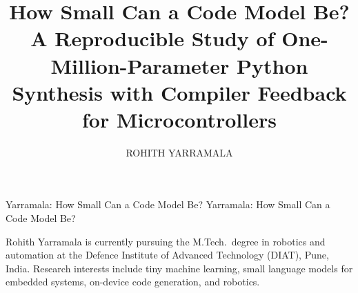 \documentclass{ieeeaccess}
\begin{document}

\title{How Small Can a Code Model Be? A Reproducible Study of One-Million-Parameter Python Synthesis with Compiler Feedback for Microcontrollers}
\author{\uppercase{Rohith Yarramala}}
\address[1]{Robotics and Automation Group, Defence Institute of Advanced Technology (DIAT), Girinagar, Pune 411025, India (e-mail: yarramala.maecas26@diat.ac.in)}

\markboth
{Yarramala: How Small Can a Code Model Be?}
{Yarramala: How Small Can a Code Model Be?}


\begin{abstract}

\end{abstract}

\begin{keywords}

\end{keywords}

\titlepgskip=-21pt

\maketitle






\begin{IEEEbiographynophoto}{Rohith Yarramala}
is currently pursuing the M.Tech.\ degree in robotics and automation at the Defence Institute of Advanced Technology (DIAT), Pune, India. Research interests include tiny machine learning, small language models for embedded systems, on-device code generation, and robotics.
\end{IEEEbiographynophoto}

\EOD
\end{document}
